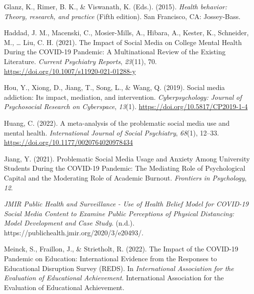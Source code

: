 \documentclass[
  man]{apa6}
\newlength{\cslhangindent}
\newlength{\cslentryspacingunit} %
\newenvironment{CSLReferences}[2] %
 {%
  \setlength{\parindent}{0pt}
  \ifodd #1
  \let\oldpar\par
  \def\par{\hangindent=\cslhangindent\oldpar}
  \fi
  \setlength{\parskip}{#2\cslentryspacingunit}
 }%
 {}
\begin{document}
\begin{CSLReferences}{1}{0}
\leavevmode{}%
Glanz, K., Rimer, B. K., \& Viswanath, K. (Eds.). (2015). \emph{Health behavior: Theory, research, and practice} (Fifth edition). {San Francisco, CA}: {Jossey-Bass}.

\leavevmode{}%
Haddad, J. M., Macenski, C., Mosier-Mills, A., Hibara, A., Kester, K., Schneider, M., \ldots{} Liu, C. H. (2021). The {Impact} of {Social Media} on {College Mental Health During} the {COVID-19 Pandemic}: A {Multinational Review} of the {Existing Literature}. \emph{Current Psychiatry Reports}, \emph{23}(11), 70. \url{https://doi.org/10.1007/s11920-021-01288-y}

\leavevmode{}%
Hou, Y., Xiong, D., Jiang, T., Song, L., \& Wang, Q. (2019). Social media addiction: {Its} impact, mediation, and intervention. \emph{Cyberpsychology: Journal of Psychosocial Research on Cyberspace}, \emph{13}(1). \url{https://doi.org/10.5817/CP2019-1-4}

\leavevmode{}%
Huang, C. (2022). A meta-analysis of the problematic social media use and mental health. \emph{International Journal of Social Psychiatry}, \emph{68}(1), 12--33. \url{https://doi.org/10.1177/0020764020978434}

\leavevmode{}%
Jiang, Y. (2021). Problematic {Social Media Usage} and {Anxiety Among University Students During} the {COVID-19 Pandemic}: {The Mediating Role} of {Psychological Capital} and the {Moderating Role} of {Academic Burnout}. \emph{Frontiers in Psychology}, \emph{12}.

\leavevmode{}%
\emph{{JMIR Public Health} and {Surveillance} - {Use} of {Health Belief Model} for {COVID-19 Social Media Content} to {Examine Public Perceptions} of {Physical Distancing}: {Model Development} and {Case Study}}. (n.d.). https://publichealth.jmir.org/2020/3/e20493/.

\leavevmode{}%
Meinck, S., Fraillon, J., \& Strietholt, R. (2022). The {Impact} of the {COVID-19 Pandemic} on {Education}: {International Evidence} from the {Responses} to {Educational Disruption Survey} ({REDS}). In \emph{International Association for the Evaluation of Educational Achievement}. {International Association for the Evaluation of Educational Achievement}.


\end{CSLReferences}
\end{document}
